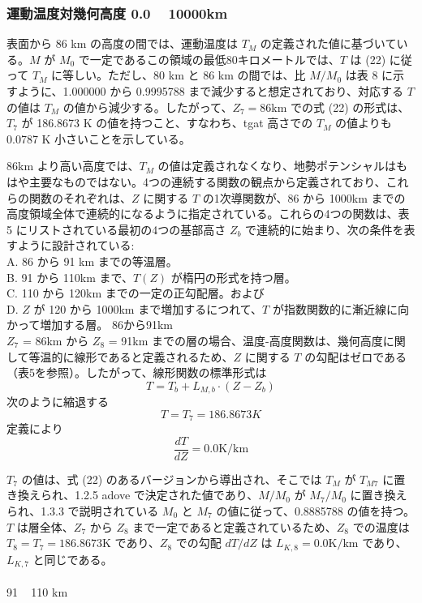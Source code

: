\documentclass{article}
\begin{document}
\subsubsection{運動温度対幾何高度 0.0 ~ 10000km}
表面から 86 km の高度の間では、運動温度は $T_M$ の定義された値に基づいている。$M$ が $M_0$ で一定であるこの領域の最低80キロメートルでは、$T$ は (22) に従って $T_M$ に等しい。ただし、80 km と 86 km の間では、比 $M/M_0$ は表 8 に示すように、1.000000 から 0.9995788 まで減少すると想定されており、対応する $T$ の値は $T_M$ の値から減少する。したがって、$Z_7 = 86$km での式 (22) の形式は、$T_7$ が 186.8673 K の値を持つこと、すなわち、tgat 高さでの $T_M$ の値よりも 0.0787 K 小さいことを示している。

86km より高い高度では、$T_M$ の値は定義されなくなり、地勢ポテンシャルはもはや主要なものではない。4つの連続する関数の観点から定義されており、これらの関数のそれぞれは、$Z$ に関する $T$ の1次導関数が、86 から 1000km までの高度領域全体で連続的になるように指定されている。これらの4つの関数は、表 5 にリストされている最初の4つの基部高さ $Z_b$ で連続的に始まり、次の条件を表すように設計されている:\\
\indent A. 86 から 91 km までの等温層。\\
\indent B. 91 から 110km まで、$T(Z)$ が楕円の形式を持つ層。\\
\indent C. 110 から 120km までの一定の正勾配層。および\\
\indent D. $Z$ が 120 から 1000km まで増加するにつれて、$T$ が指数関数的に漸近線に向かって増加する層。
86から91km\\

$Z_7$ = 86km から $Z_8$ = 91km までの層の場合、温度-高度関数は、幾何高度に関して等温的に線形であると定義されるため、$Z$ に関する $T$ の勾配はゼロである（表5を参照）。したがって、線形関数の標準形式は
\begin{equation}
  T = T_b + L_{M,b}\cdot (Z - Z_b)
  \tag{24}
\end{equation}
次のように縮退する
\begin{equation}
  T= T_7 = 186.8673 K
  \tag{25}
\end{equation}
定義により
\begin{equation}
  \frac{dT}{dZ} = 0.0 \text{K/km}
  \tag{26}
\end{equation}

$T_7$ の値は、式 (22) のあるバージョンから導出され、そこでは $T_M$ が $T_{M7}$ に置き換えられ、1.2.5 adove で決定された値であり、$M/M_0$ が $M_7/M_0$ に置き換えられ、1.3.3 で説明されている $M_0$ と $M_7$ の値に従って、0.8885788 の値を持つ。$T$ は層全体、$Z_7$ から $Z_8$ まで一定であると定義されているため、$Z_8$ での温度は $T_8 = T_7 = 186.8673$K であり、$Z_8$ での勾配 $dT/dZ$ は $L_{K,8} = 0.0\text{K/km}$ であり、$L_{K,7}$ と同じである。\\\\
91 ~ 110 km
\end{document}
